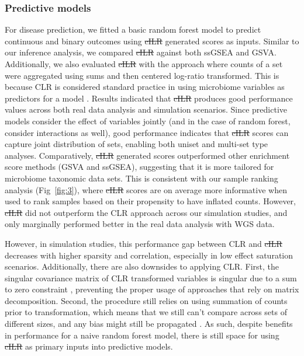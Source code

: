 \documentclass[10pt,letterpaper]{article}
\providecommand{\DIFaddtex}[1]{{\protect\color{blue}\uwave{#1}}} %
\providecommand{\DIFdeltex}[1]{{\protect\color{red}\sout{#1}}}                      %
\providecommand{\DIFaddbegin}{} %
\providecommand{\DIFaddend}{} %
\providecommand{\DIFdelbegin}{} %
\providecommand{\DIFdelend}{} %
\providecommand{\DIFadd}[1]{\texorpdfstring{\DIFaddtex{#1}}{#1}} %
\providecommand{\DIFdel}[1]{\texorpdfstring{\DIFdeltex{#1}}{}} %
\newcommand{\DIFscaledelfig}{0.5}
\newlength{\DIFdelgraphicswidth} %
\newlength{\DIFdelgraphicsheight} %
\newcommand{\DIFaddincludegraphics}[2][]{{\color{blue}\fbox{\DIFOincludegraphics[#1]{#2}}}} %
\newcommand{\DIFdelincludegraphics}[2][]{%
\sbox{\DIFdelgraphicsbox}{\DIFOincludegraphics[#1]{#2}}%
\settoboxwidth{\DIFdelgraphicswidth}{\DIFdelgraphicsbox} %
\settoboxtotalheight{\DIFdelgraphicsheight}{\DIFdelgraphicsbox} %
\scalebox{\DIFscaledelfig}{%
\parbox[b]{\DIFdelgraphicswidth}{\usebox{\DIFdelgraphicsbox}\\[-\baselineskip] \rule{\DIFdelgraphicswidth}{0em}}\llap{\resizebox{\DIFdelgraphicswidth}{\DIFdelgraphicsheight}{%
\setlength{\unitlength}{\DIFdelgraphicswidth}%
\begin{picture}(1,1)%
\thicklines\linethickness{2pt} %
{\color[rgb]{1,0,0}\put(0,0){\framebox(1,1){}}}%
{\color[rgb]{1,0,0}\put(0,0){\line( 1,1){1}}}%
{\color[rgb]{1,0,0}\put(0,1){\line(1,-1){1}}}%
\end{picture}%
}\hspace*{3pt}}} %
} %
\DeclareRobustCommand{\DIFaddbegin}{\DIFOaddbegin \let\includegraphics\DIFaddincludegraphics} %
\DeclareRobustCommand{\DIFaddend}{\DIFOaddend \let\includegraphics\DIFOincludegraphics} %
\DeclareRobustCommand{\DIFdelbegin}{\DIFOdelbegin \let\includegraphics\DIFdelincludegraphics} %
\DeclareRobustCommand{\DIFdelend}{\DIFOaddend \let\includegraphics\DIFOincludegraphics} %
\begin{document}
\subsubsection*{Predictive models}
For disease prediction, we fitted a basic random forest model \cite{breiman2001} to predict continuous and binary outcomes using \DIFdelbegin \DIFdel{cILR }\DIFdelend \DIFaddbegin \DIFadd{CBEA }\DIFaddend generated scores as inputs. Similar to our inference analysis, we compared \DIFdelbegin \DIFdel{cILR }\DIFdelend \DIFaddbegin \DIFadd{CBEA }\DIFaddend against both ssGSEA and GSVA. Additionally, we also evaluated \DIFdelbegin \DIFdel{cILR }\DIFdelend \DIFaddbegin \DIFadd{CBEA }\DIFaddend with the approach where counts of a set were aggregated using sums and then centered log-ratio transformed. This is because CLR is considered standard practice in using microbiome variables as predictors for a model \cite{gloor2017}. Results indicated that \DIFdelbegin \DIFdel{cILR }\DIFdelend \DIFaddbegin \DIFadd{CBEA }\DIFaddend produces good performance values across both real data analysis and simulation scenarios. Since predictive models consider the effect of variables jointly (and in the case of random forest, consider interactions as well), good performance indicates that \DIFdelbegin \DIFdel{cILR }\DIFdelend \DIFaddbegin \DIFadd{CBEA }\DIFaddend scores can capture joint distribution of sets, enabling both uniset and multi-set type analyses. Comparatively, \DIFdelbegin \DIFdel{cILR }\DIFdelend \DIFaddbegin \DIFadd{CBEA }\DIFaddend generated scores outperformed other enrichment score methods (GSVA and ssGSEA), suggesting that it is more tailored for microbiome taxonomic data sets. This is consistent with our sample ranking analysis (Fig~\ref{fig:3}), where \DIFdelbegin \DIFdel{cILR }\DIFdelend \DIFaddbegin \DIFadd{CBEA }\DIFaddend scores are on average more informative when used to rank samples based on their propensity to have inflated counts. However, \DIFdelbegin \DIFdel{cILR }\DIFdelend \DIFaddbegin \DIFadd{CBEA }\DIFaddend did not outperform the CLR approach across our simulation studies, and only marginally performed better in the real data analysis with WGS data. 

However, in simulation studies, this performance gap between CLR and \DIFdelbegin \DIFdel{cILR }\DIFdelend \DIFaddbegin \DIFadd{CBEA }\DIFaddend decreases with higher sparsity and correlation, especially in low effect saturation scenarios. Additionally, there are also downsides to applying CLR. First, the singular covariance matrix of CLR transformed variables is singular due to a sum to zero constraint \cite{gloor2017}, preventing the proper usage of approaches that rely on matrix decomposition. Second, the procedure still relies on using summation of counts prior to transformation, which means that we still can't compare across sets of different sizes, and any bias might still be propagated \cite{mclaren2019}. As such, despite benefits in performance for a naive random forest model, there is still space for using \DIFdelbegin \DIFdel{cILR }\DIFdelend \DIFaddbegin \DIFadd{CBEA }\DIFaddend as primary inputs into predictive models. 
\end{document}

